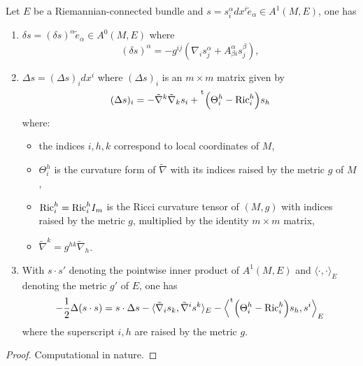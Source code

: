 \begin{lemma}
\label{lem:calculs-general}
Let \(E\) be a Riemannian-connected bundle and \(s = s^\alpha_i dx^i \tilde e_\alpha\in A^1(M,E)\), one has
\begin{enumerate}
\item \(\delta s = (\delta s)^\alpha \tilde e_\alpha \in A^0(M,E)\) where
\[
    (\delta s)^\alpha = -g^{ij}\left(\nabla_i s^\alpha_j + A^\alpha_{\beta i} s^\beta_j \right),
   \]
\item \(\Delta s = (\Delta s)_i dx^i\) where \((\Delta s)_i\) is an \(m\times m\)
matrix given by
\[
    (\Delta s)_i = -{\tilde\nabla}^k {\tilde\nabla}_k s_i + \mskip1mu\prescript{\smash{\mathrm t\mkern-3mu}}{}{\mathstrut\left(\Theta_i^h - {\rm
   Ric}_i^h\right)} s_h
   \]
where:
\begin{itemize}
\item the indices \(i,h,k\) correspond to local coordinates of \(M\),
\item \(\Theta_i^h\) is the curvature form of \(\tilde\nabla\) with its
indices raised by the metric \(g\) of \(M\),
\item \({\rm Ric}_i^h = {\rm Ric}_i^h I_m\) is the Ricci curvature tensor of \((M,g)\) with indices
raised by the metric \(g\), multiplied by the identity \(m\times m\) matrix,
\item \(\tilde \nabla^k = g^{hk}\tilde\nabla_h\).
\end{itemize}
\item With \(s\cdot s'\) denoting the pointwise inner product of \(A^1(M,E)\) and \(\langle \cdot,\cdot \rangle_E\) denoting the metric \(g'\) of \(E\), one has
\begin{equation}
\label{eq:laplace-Q}   
 -\frac{1}{2}\Delta(s\cdot s) =  s\cdot \Delta s - \langle\tilde\nabla_i s_k,\tilde\nabla^i s^k \rangle_E - \left\langle \mskip1mu\prescript{\smash{\mathrm t\mkern-3mu}}{}{\mathstrut\left(\Theta_i^h - {\rm Ric}_i^h\right)}s_h, s^i\right\rangle_E
\end{equation}
where the superscript \(i,h\) are raised by the metric \(g\).
\end{enumerate}
\end{lemma}
\begin{proof}
Computational in nature.
\end{proof}

